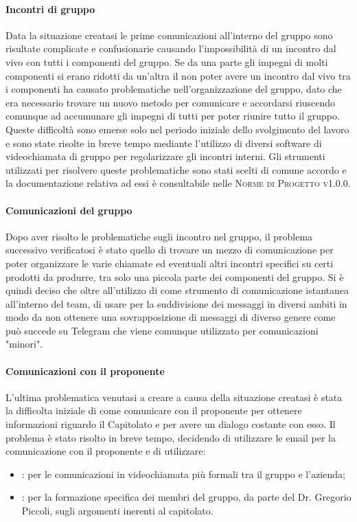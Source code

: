 \documentclass[../piano-di-qualifica.tex]{subfiles}
\begin{document}
\paragraph{Incontri di gruppo}
\label{sub:incontri_di_gruppo}
Data la situazione creatasi le prime comunicazioni all'interno del gruppo sono risultate complicate e confusionarie causando l'impossibilità di un incontro dal vivo con tutti i componenti del gruppo.
Se da una parte gli impegni di molti componenti si erano ridotti da un'altra il non poter avere un incontro dal vivo tra i componenti ha causato problematiche nell'organizzazione del gruppo, dato che era necessario trovare un nuovo metodo per comunicare e accordarsi riuscendo comunque ad accumunare gli impegni di tutti per poter riunire tutto il gruppo.
Queste difficoltà sono emerse solo nel periodo iniziale dello svolgimento del lavoro e sono state risolte in breve tempo mediante l'utilizzo di diversi software di videochiamata di gruppo per regolarizzare gli incontri interni.
Gli strumenti utilizzati per risolvere queste problematiche sono stati scelti di comune accordo e la documentazione relativa ad essi è consultabile nelle \textsc{Norme di Progetto v1.0.0}.

\paragraph{Comunicazioni del gruppo}
\label{sub:comunicazione_del_gruppo}
Dopo aver risolto le problematiche sugli incontro nel gruppo, il problema successivo verificatosi è stato quello di trovare un mezzo di comunicazione per poter organizzare le varie chiamate ed eventuali altri incontri specifici su certi prodotti da produrre, tra solo una piccola parte dei componenti del gruppo.
Si è quindi deciso che oltre all'utilizzo di  come strumento di comunicazione istantanea all'interno del team, di usare  per la suddivisione dei messaggi in diversi ambiti in modo da non ottenere una sovrapposizione di messaggi di diverso genere come può succede su Telegram che viene comunque utilizzato per comunicazioni "minori".

\paragraph{Comunicazioni con il proponente}
\label{sub:comunicazione_con_il_proponente}
L'ultima problematica venutasi a creare a causa della situazione creatasi è stata la difficolta iniziale di come comunicare con il proponente per ottenere informazioni riguardo il Capitolato e per avere un dialogo costante con esso.
Il problema è stato risolto in breve tempo, decidendo di utilizzare le email per la comunicazione con il proponente e di utilizzare:
\begin{itemize}
    \item \textbf{}: per le comunicazioni in videochiamata più formali tra il gruppo e l'azienda;
    \item \textbf{}: per la formazione specifica dei membri del gruppo, da parte del Dr. Gregorio Piccoli, sugli argomenti inerenti al capitolato.
\end{itemize}
\end{document}
